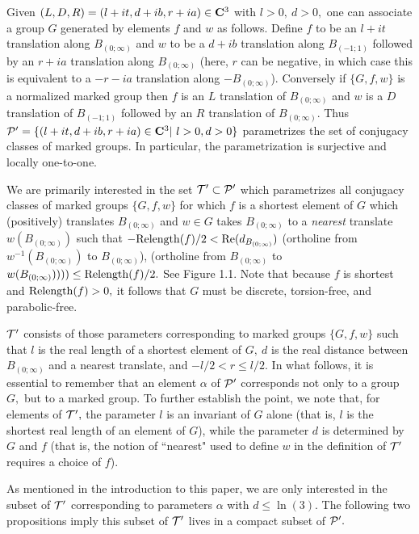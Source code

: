 Given $(L,D,R)=(l+it, d+ib, r+ia)\in{\bf C}^3$ with $l > 0,\ d > 0,$ one  can associate a group $G$ generated by  elements $f$ and $w$ as follows.  Define $f$ to be an $l+it$ translation along $B_{(0;\infty)}$ and $w$ to be a $d+ib$ translation along $ B_{(-1;1)}$ followed by an $r+ia$ translation along $B_{(0;\infty)}$ (here, $r$ can be negative, in which case this is equivalent to
a
$-r-ia$ translation along $-B_{(0;\infty)}$).  Conversely if $\{G,f,w\}$ is a normalized marked group then $f$ is an $L$ translation of $B_{(0;\infty)}$
and $w$ is a $D$ translation of 
$ B_{(-1;1)}$ followed by an $R$ translation of $B_{(0;\infty)}.$ Thus
${\cal P}^\prime = \{(l+it,d+ib,r+ia)\in {\bf C}^3 | \ l>0, d>0\}$ 
parametrizes the
set of conjugacy classes of marked groups.  In particular, the parametrization is surjective and locally one-to-one.

We are primarily interested in the set 
${\cal T}^{\prime}\subset {\cal P}^{\prime}$
which parametrizes all conjugacy classes of 
marked groups
$\{G,f,w\}$ for which $f$ is a shortest element  of $G$ which (positively) translates $B_{(0;\infty)}$ and $w\in G$ takes $ B_{(0;\infty)}$ to a
{\it nearest} translate $w(B_{(0;\infty)})$ such that 
$-{\rm Relength}(f)/2< {\rm Re}(d_ {B_{(0;\infty)}})$
(ortholine from $w^{-1}( B_{(0;\infty)})$ to $ B_{(0;\infty)}$),
(ortholine from $ B_{(0;\infty)}$ to $w(B_{(0;\infty)}))))
\le {\rm Relength}(f)/2.$  
See Figure 1.1.
Note that because $f$ is shortest and
$\Relength(f)\break > 0,$ it follows that $G$ must be 
discrete, torsion-free, and parabolic-free.
 


  ${\cal T}^{\prime}$ consists of those parameters corresponding to marked groups $\{G,f,w\}$ such that $l$ is the real
length of a shortest element of $G,\  d$ is the real distance between $ B_{(0;\infty)}$ and a nearest
translate, and $-l/2<r\le l/2.$  
In what follows, it is
essential to remember that an element $\alpha$ of ${\cal P^{\prime}}$ corresponds not only
to a group $G,$ but to a marked group.  
To further establish the point, we note that,
for elements of ${\cal T}^{\prime},$
the parameter $l$ is an invariant of $G$ alone (that is, $l$ is the shortest real length of an element of $G$), while  the parameter $d$ is determined by $G$ and $f$ (that is, the notion of ``nearest" used to define $w$ in the definition of ${\cal T}^{\prime}$ requires a choice of $f$).

As mentioned in the introduction to this paper, we are only interested in the subset of ${\cal T}^{\prime}$ corresponding to
parameters $\alpha$ with $d \le \ln(3).$  The
following two propositions imply this subset of ${\cal T}^{\prime}$ lives in a compact subset of ${\cal P}^{\prime}.$
\enddemo

